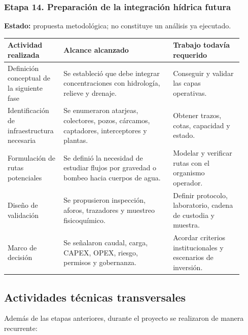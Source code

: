 \documentclass[
  spanish,
]{article}
\newcounter{none} %
\begin{document}
\subsubsection{Etapa 14. Preparación de la integración hídrica
futura}\label{etapa-14-preparaciuxf3n-de-la-integraciuxf3n-huxeddrica-futura}

\textbf{Estado:} propuesta metodológica; no constituye un análisis ya
ejecutado.

{\def\LTcaptype{none} %
\begin{longtable}[]{@{}p{0.20\linewidth}p{0.44\linewidth}p{0.28\linewidth}@{}}
\toprule\noalign{}
Actividad realizada & Alcance alcanzado & Trabajo todavía requerido \\
\midrule\noalign{}
\endhead
\bottomrule\noalign{}
\endlastfoot
Definición conceptual de la siguiente fase & Se estableció que debe
integrar concentraciones con hidrología, relieve y drenaje. & Conseguir
y validar las capas operativas. \\
Identificación de infraestructura necesaria & Se enumeraron atarjeas,
colectores, pozos, cárcamos, captadores, interceptores y plantas. &
Obtener trazos, cotas, capacidad y estado. \\
Formulación de rutas potenciales & Se definió la necesidad de estudiar
flujos por gravedad o bombeo hacia cuerpos de agua. & Modelar y
verificar rutas con el organismo operador. \\
Diseño de validación & Se propusieron inspección, aforos, trazadores y
muestreo fisicoquímico. & Definir protocolo, laboratorio, cadena de
custodia y muestra. \\
Marco de decisión & Se señalaron caudal, carga, CAPEX, OPEX, riesgo,
permisos y gobernanza. & Acordar criterios institucionales y escenarios
de inversión. \\
\end{longtable}
}

\subsection{Actividades técnicas
transversales}\label{actividades-tuxe9cnicas-transversales}

Además de las etapas anteriores, durante el proyecto se realizaron de
manera recurrente:
\end{document}
